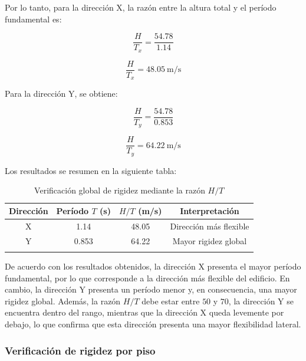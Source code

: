 Por lo tanto, para la dirección X, la razón entre la altura total y el período fundamental es:

\begin{equation}
\frac{H}{T_x} = \frac{54.78}{1.14}
\end{equation}

\begin{equation}
\frac{H}{T_x} = 48.05 \ \text{m/s}
\end{equation}

Para la dirección Y, se obtiene:

\begin{equation}
\frac{H}{T_y} = \frac{54.78}{0.853}
\end{equation}

\begin{equation}
\frac{H}{T_y} = 64.22 \ \text{m/s}
\end{equation}

Los resultados se resumen en la siguiente tabla:

\begin{table}[H]
    \centering
    \caption{Verificación global de rigidez mediante la razón $H/T$}
    \begin{tabular}{cccc}
    \hline
    Dirección & Período $T$ (s) & $H/T$ (m/s) & Interpretación \\
    \hline
    X & 1.14 & 48.05 & Dirección más flexible \\
    Y & 0.853 & 64.22 & Mayor rigidez global \\
    \hline
        \vspace{0.001cm}
    \end{tabular}
    
\end{table}

De acuerdo con los resultados obtenidos, la dirección X presenta el mayor período fundamental, por lo que corresponde a la dirección más flexible del edificio. En cambio, la dirección Y presenta un período menor y, en consecuencia, una mayor rigidez global. Además, la razón $H/T$ debe estar entre $50$ y $70$, la dirección Y se encuentra dentro del rango, mientras que la dirección X queda levemente por debajo, lo que confirma que esta dirección presenta una mayor flexibilidad lateral.

\subsubsection{Verificación de rigidez por piso}

